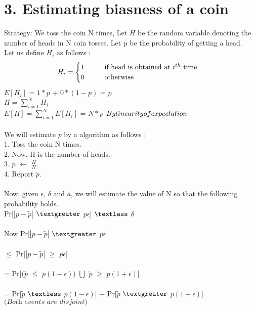 \documentclass{article}
\begin{document}
\section*{3. Estimating biasness of a coin }
Strategy:
We toss the coin N times, Let $H$ be the random variable denoting the number of heads in N coin tosses. Let p be the probability of getting a head.\\ %
Let us define $H_i$ as follows : \\  
\[
	H_i =\begin{cases}
		1  \hspace{1cm}   $if head is obtained at $i^{th}$ time$ \\
		0  \hspace{1cm}   $otherwise$ 
		\end{cases}
\] 
$E[H_i]$ = $1*p$ + $0*(1-p)$  = $p$ \\ 
$H = \sum_{i=1}^{N}H_i$ \\ 
$E[H] = \sum_{i=1}^{N}E[H_i]$ = $N*p$ $\hfill{By linearity of expectation}$\\\\
We will estimate $p$ by a algorithm as follows : \\
1. Toss the coin N times. \\
2. Now, H is the number of heads. \\
3. $\widetilde{p}$ $\leftarrow$ $\frac{H}{N}$. \\
4. Report  $\widetilde{p}$. \\\\
Now, given $\epsilon$, $\delta$ and $a$, we will estimate the value of N so that the following probability holds. \\
Pr[$|p - \widetilde{p}|$ $\textgreater$ $p\epsilon$] $\textless$ $\delta$ \\\\
Now Pr[$|p - \widetilde{p}|$ $\textgreater$ $p\epsilon$] \\\\
$\leq$ Pr[$|p - \widetilde{p}|$ $\geq$ $p\epsilon$] \\\\ 
= Pr[$(\widetilde{p}$ $\leq$ $p(1 - \epsilon))$ $\bigcup$ $\widetilde{p}$ $\geq$ $p(1 + \epsilon)$]  \\\\
=  Pr[$\widetilde{p}$ $\textless$ $p(1 - \epsilon)$]
+ Pr[$\widetilde{p}$ $\textgreater$ $p(1 + \epsilon)$]\hfill{$\textit{(Both events are disjoint)}$}\\\\
\end{document}
